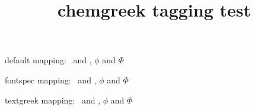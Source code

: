 \documentclass{article}
\title{chemgreek tagging test}
\begin{document}
default mapping: \chemphi\ and \chemPhi, $\phi$ and $\Phi$

\printchemgreekalphabet

\ifdefined\Uchar
{}
fontspec mapping: \chemphi\ and \chemPhi, $\phi$ and $\Phi$
\fi

\printchemgreekalphabet

textgreek mapping: \chemphi\ and \chemPhi, $\phi$ and $\Phi$

\printchemgreekalphabet
\end{document}
